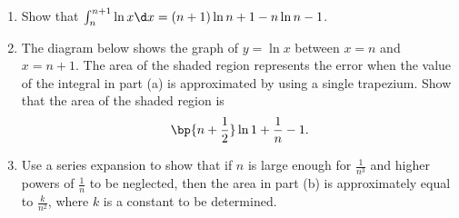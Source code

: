 \begin{problem}
    \begin{enumerate}
        \item Show that $\int_n^{n+1} \ln x \d x = (n+1)\ln{n+1} - n\ln n - 1$.
        \item The diagram below shows the graph of $y=\ln x$ between $x=n$ and $x=n+1$. The area of the shaded region represents the error when the value of the integral in part (a) is approximated by using a single trapezium. Show that the area of the shaded region is \[\bp{n + \frac12} \ln{1 + \frac1n} - 1.\]

        \begin{center}
        \end{center}
        \item Use a series expansion to show that if $n$ is large enough for $\frac{1}{n^{3}}$ and higher powers of $\frac{1}{n}$ to be neglected, then the area in part (b) is approximately equal to $\frac{k}{n^2}$, where $k$ is a constant to be determined.
    \end{enumerate}
\end{problem}
